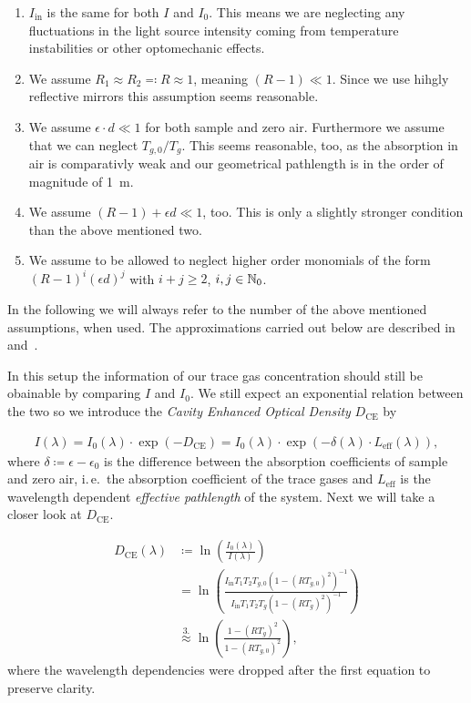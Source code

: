 \begin{enumerate}
\item $I_{\text{in}}$ is the same for both $I$ and $I_0$. This means
  we are neglecting any fluctuations in the light source intensity
  coming from temperature instabilities or other optomechanic effects.
\item We assume $R_1 \approx R_2 \eqqcolon R \approx 1$, meaning $(R -
  1) \ll 1$. Since we use hihgly reflective mirrors this assumption
  seems reasonable.
\item We assume $\epsilon \cdot d \ll 1$ for both sample and zero
  air. Furthermore we assume  that we can neglect
  $T_{g,0}/T_{g}$. This seems reasonable, too, as the absorption in
  air is comparativly weak and our geometrical pathlength is in the
  order of magnitude of \SI{1}{\meter}.
\item We assume  $(R - 1) + \epsilon d \ll 1$, too. This is only a
  slightly stronger condition than the above mentioned two.
\item We assume to be allowed to neglect higher order monomials of the
  form $(R-1)^i(\epsilon d)^j$  with $i+j \geq 2$, $i,j \in \mathbb{N}_0$.
\end{enumerate}

In the following we will always refer to the number of the above
mentioned assumptions, when used. The approximations carried out below
are described in~\cite{platt2009} and~\cite{fiedler2003}.

In this setup the information of our trace gas concentration should
still be obainable by comparing $I$ and $I_0$. We still expect an
exponential relation between the two so we introduce the \emph{Cavity
  Enhanced Optical Density} $D_{\text{CE}}$ by

\begin{align}
  I(\lambda) = I_0(\lambda) \cdot \exp(- D_{\text{CE}}) = I_0(\lambda)
  \cdot \exp(-\delta(\lambda) \cdot L_{\text{eff}}(\lambda)),\label{eq:opt-dens}
\end{align}
where $\delta \coloneqq \epsilon - \epsilon_0$ is the difference
between the absorption coefficients of sample and zero air, i.\,e.\ the
absorption coefficient of the trace gases and $L_{\text{eff}}$ is the
wavelength dependent \emph{effective pathlength} of the system. Next
we will take a closer look at $D_{\text{CE}}$.

\begin{align}
  D_{\text{CE}}(\lambda) & \coloneqq \ln\left(
                           \frac{I_0(\lambda)}{I(\lambda)}\right)\nonumber\\
                         & = \ln\left ( \frac{I_{\text{in}}T_1T_2T_{g,0}(1 -
                           (RT_{g,0})^2)^{-1}}{I_{\text{in}}T_1T_2T_g(1 -
                           (RT_g)^2)^{-1}}\right)\nonumber\\
                         & \stackrel{3.}{\approx} \ln\left( \frac{1 -
                           (RT_g)^2}{1 - (RT_{g,0})^2}\right)\label{eq:d_ce},
\end{align}
where the wavelength dependencies were dropped after the first
equation to preserve clarity. 

